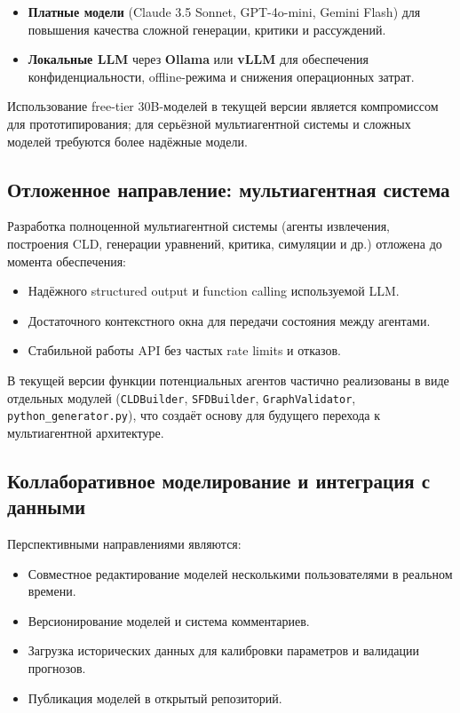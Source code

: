 \begin{itemize}
    \item \textbf{Платные модели} (Claude 3.5 Sonnet, GPT-4o-mini, Gemini Flash) для повышения качества сложной генерации, критики и рассуждений.
    \item \textbf{Локальные LLM} через \textbf{Ollama} или \textbf{vLLM} для обеспечения конфиденциальности, offline-режима и снижения операционных затрат.
\end{itemize}

Использование free-tier 30B-моделей в текущей версии является компромиссом для прототипирования; для серьёзной мультиагентной системы и сложных моделей требуются более надёжные модели.

\subsection{Отложенное направление: мультиагентная система}

Разработка полноценной мультиагентной системы (агенты извлечения, построения CLD, генерации уравнений, критика, симуляции и др.) отложена до момента обеспечения:

\begin{itemize}
    \item Надёжного structured output и function calling используемой LLM.
    \item Достаточного контекстного окна для передачи состояния между агентами.
    \item Стабильной работы API без частых rate limits и отказов.
\end{itemize}

В текущей версии функции потенциальных агентов частично реализованы в виде отдельных модулей (\texttt{CLDBuilder}, \texttt{SFDBuilder}, \texttt{GraphValidator}, \texttt{python\_generator.py}), что создаёт основу для будущего перехода к мультиагентной архитектуре.

\subsection{Коллаборативное моделирование и интеграция с данными}

Перспективными направлениями являются:

\begin{itemize}
    \item Совместное редактирование моделей несколькими пользователями в реальном времени.
    \item Версионирование моделей и система комментариев.
    \item Загрузка исторических данных для калибровки параметров и валидации прогнозов.
    \item Публикация моделей в открытый репозиторий.
\end{itemize}


